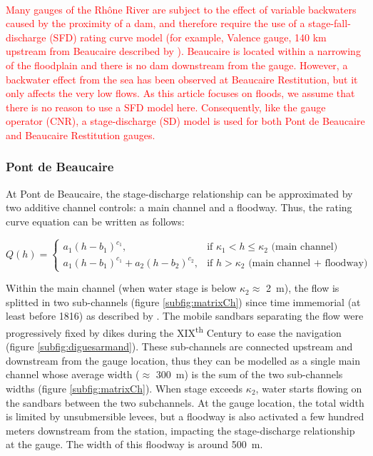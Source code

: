 \documentclass[11pt]{article}
\begin{document}
	\paragraph{} \textcolor{red}{Many gauges of the Rhône River are subject to the effect of variable backwaters caused by the proximity of a dam, and therefore require the use of a stage-fall-discharge (SFD) rating curve model (for example, Valence gauge, 140 km upstream from Beaucaire described by \cite{mansanarez_non-unique_2016}). Beaucaire is located within a narrowing of the floodplain and there is no dam downstream from the gauge. However, a backwater effect from the sea has been observed at Beaucaire Restitution, but it only affects the very low flows. As this article focuses on floods, we assume that there is no reason to use a SFD model here. Consequently, like the gauge operator (CNR), a stage-discharge (SD) model is used for both Pont de Beaucaire and Beaucaire Restitution gauges.}    
        
        \subsubsection{Pont de Beaucaire}
        
         At Pont de Beaucaire, the stage-discharge relationship can be approximated by two additive channel controls: a main channel and a floodway. Thus, the rating curve equation can be written as follows: 

        \begin{equation}
        Q(h) =
          \begin{cases}
           a_1(h-b_1)^{c_1}, & \text{if $\kappa_1 < h \leq \kappa_2$ (main channel) }\\
           a_1(h-b_1)^{c_1}+ a_2(h-b_2)^{c_2}, & \text{if $h > \kappa_2$ (main channel + floodway)}
          \end{cases}
          \label{eq:RcPt}
        \end{equation}

    Within the main channel (when water stage is below $\kappa_2 \approx$ 2~m), the flow is splitted in two sub-channels (figure \ref{subfig:matrixCh}) since time immemorial (at least before 1816) as described by \citet{armand_ii_1907}. The mobile sandbars separating the flow were progressively fixed by dikes during the XIX\textsuperscript{th} Century to ease the navigation (figure \ref{subfig:diguesarmand}). These sub-channels are connected upstream and downstream from the gauge location, thus they can be modelled as a single main channel whose average width ($\approx$ 300~m) is the sum of the two sub-channels widths (figure \ref{subfig:matrixCh}). When stage exceeds $\kappa_2$, water starts flowing on the sandbars between the two subchannels. At the gauge location, the total width is limited by unsubmersible levees, but a floodway is also activated a few hundred meters downstream from the station, impacting the stage-discharge relationship at the gauge. The width of this floodway is around 500~m.   
\end{document}
